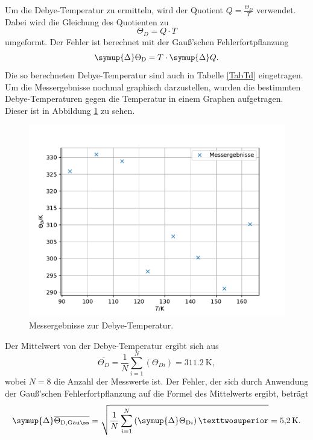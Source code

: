 Um die Debye-Temperatur zu ermitteln, wird der Quotient $Q = \frac{\Theta_{\si{D}}}{T}$ verwendet. Dabei 
wird die Gleichung des Quotienten zu 
\begin{equation*}
    \Theta_{\si{D}} = Q \cdot T
\end{equation*} 
umgeformt. 
Der Fehler ist berechnet mit der Gauß'schen Fehlerfortpflanzung 
\begin{equation*}
    \symup{\Delta}\Theta_{\si{D}} = T \cdot \symup{\Delta}Q.
\end{equation*}
Die so berechneten Debye-Temperatur sind auch in Tabelle \ref{TabTd} eingetragen.
Um die Messergebnisse nochmal graphisch darzustellen, wurden die bestimmten Debye-Temperaturen gegen die 
Temperatur in einem Graphen aufgetragen. Dieser ist in Abbildung \ref{fig:e} zu sehen.

\begin{figure}
  \centering
  \includegraphics{ende.pdf}
  \caption{Messergebnisse zur Debye-Temperatur.}
  \label{fig:e}
\end{figure}
\FloatBarrier

Der Mittelwert von der Debye-Temperatur ergibt sich aus
\begin{equation*}
  \overline{\Theta_{\si{D}}}=  \frac{1}{N} \sum_{i=1}^N (\Theta_{\si{D}i}) = \SI{311,2}{\kelvin},
\end{equation*}
wobei $N=8$ die Anzahl der Messwerte ist. Der Fehler, der sich durch Anwendung der Gauß'schen Fehlerfortpflanzung 
auf die Formel des Mittelwerts ergibt, beträgt
\begin{equation*}
  \symup{\Delta} \overline{\Theta_{\si{D, Gauß}}} =\sqrt{\frac{1}{N} \sum_{i=1}^N \left( \symup{\Delta} \Theta_{\si{D}i} \right)² } = \SI{5,2}{\kelvin}.
\end{equation*}

